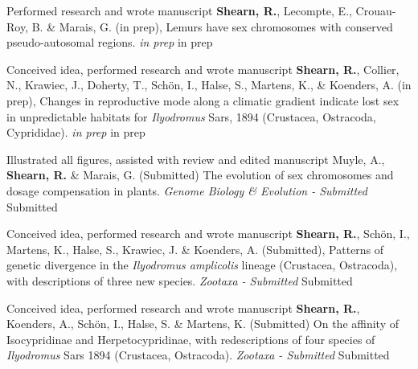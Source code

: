 

\begin{cvpubs}

  \cvpub
    {Performed research and wrote manuscript} %
    {\textbf{Shearn, R.}, Lecompte, E., Crouau-Roy, B. \& Marais, G. (in prep), Lemurs have sex chromosomes with conserved pseudo-autosomal regions. \emph{in prep}} %
    {in prep} %

  \cvpub
    {Conceived idea, performed research and wrote manuscript} %
    {\textbf{Shearn, R.}, Collier, N., Krawiec, J., Doherty, T., Schön, I., Halse, S., Martens, K., \& Koenders, A. (in prep), Changes in reproductive mode along a climatic gradient indicate lost sex in unpredictable habitats for \textit{Ilyodromus} Sars, 1894 (Crustacea, Ostracoda, Cyprididae). \emph{in prep}} %
    {in prep} %

  \cvpub
    {Illustrated all figures, assisted with review and edited manuscript} %
    {Muyle, A., \textbf{Shearn, R.} \& Marais, G. (Submitted) The evolution of sex chromosomes and dosage compensation in plants. \emph{Genome Biology \& Evolution - Submitted}} %
    {Submitted} %

  \cvpub
    {Conceived idea, performed research and wrote manuscript} %
    {\textbf{Shearn, R.}, Schön, I., Martens, K., Halse, S., Krawiec, J. \& Koenders, A. (Submitted), Patterns of genetic divergence in the \textit{Ilyodromus amplicolis} lineage (Crustacea, Ostracoda), with descriptions of three new species. \emph{Zootaxa - Submitted}} %
    {Submitted} %

  \cvpub
    {Conceived idea, performed research and wrote manuscript} %
    {\textbf{Shearn, R.}, Koenders, A., Schön, I., Halse, S. \& Martens, K. (Submitted) On the affinity of Isocypridinae and Herpetocypridinae, with redescriptions of four species of \textit{Ilyodromus} Sars 1894 (Crustacea, Ostracoda). \emph{Zootaxa - Submitted}} %
    {Submitted} %


\end{cvpubs}
